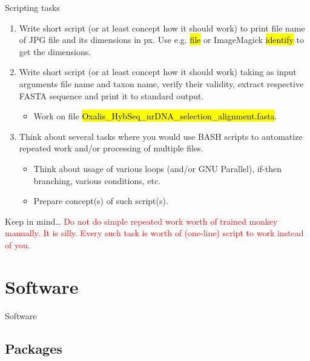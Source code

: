 \documentclass[compress, ucs, xelatex, 11pt, xcolor=svgnames, aspectratio=169,
	hyperref={
		bookmarks=true,
		unicode=true,
		colorlinks=true,
		pdftitle={Linux, command line and MetaCentrum},
		plainpages=false,
		pdfauthor={Vojtech Zeisek},
		pdfsubject={Course about use of Linux command line, writing shell scripts and using MetaCentrum of CESNET},
		pdfcreator={XeLaTeX},
		pdfkeywords={Linux, GNU, BASH, shell, command line, MetaCentrum},
		linkcolor=DarkRed, %
		anchorcolor=DarkBlue, %
		citecolor=Indigo, %
		filecolor=NavyBlue, %
		menucolor=DarkMagenta, %
		urlcolor=DarkBlue, %
		pdftex},
	url={hyphens, lowtilde} %
	]{beamer}
\renewcommand{\texttt}[1]{\hl{\ttfamily #1}}
\renewcommand{\alert}[1]{\textcolor{red}{#1}}
\begin{document}
\begin{frame}{Scripting tasks}
	\begin{enumerate}
		\item Write short script (or at least concept how it should work) to print file name of JPG file and its dimensions in px. Use e.g. \texttt{file} or ImageMagick \texttt{identify} to get the dimensions.
		\item Write short script (or at least concept how it should work) taking as input arguments file name and taxon name, verify their validity, extract respective FASTA sequence and print it to standard output.
		\begin{itemize}
			\item Work on file \texttt{Oxalis\_HybSeq\_nrDNA\_selection\_alignment.fasta}.
		\end{itemize}
		\item Think about several tasks where you would use BASH scripts to automatize repeated work and/or processing of multiple files.
		\begin{itemize}
			\item Think about usage of various loops (and/or GNU Parallel), if-then branching, various conditions, etc.
			\item Prepare concept(s) of such script(s).
		\end{itemize}
	\end{enumerate}
	\begin{block}{Keep in mind\ldots}
		\alert{Do not do simple repeated work worth of trained monkey manually. It is silly. Every such task is worth of (one-line) script to work instead of you.}
	\end{block}
\end{frame}

\section{Software}

\begin{frame}{Software}
	\tableofcontents[currentsection, sectionstyle=show/hide, hideothersubsections]
\end{frame}

\subsection{Packages}
\end{document}
